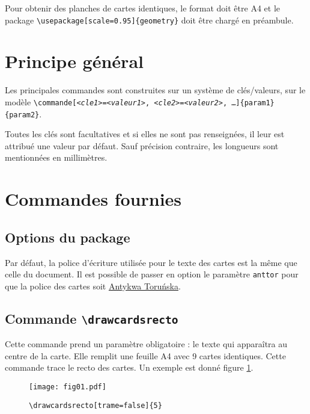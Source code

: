 \documentclass[a4paper, 12pt]{article}
\newcommand{\kv}[2]{\textit{<#1>}\texttt=\textit{<#2>}}
\newcommand{\commande}[1]{\texttt{\textbackslash#1}}
\begin{document}
Pour obtenir des planches de cartes identiques, le format doit être A4 et le package \commande{usepackage[scale=0.95]\{geometry\}} doit être chargé en préambule.

\section{Principe général}
Les principales commandes sont construites sur un système de clés/valeurs, sur le modèle \texttt{\textbackslash commande[\kv{cle1}{valeur1}, \kv{cle2}{valeur2}, …]\{param1\}\{param2\}}.

Toutes les clés sont facultatives et si elles ne sont pas renseignées, il leur est attribué une valeur par défaut. Sauf précision contraire, les longueurs sont mentionnées en millimètres.

\section{Commandes fournies}
	\subsection{Options du package}
Par défaut, la police d'écriture utilisée pour le texte des cartes est la même que celle du document. Il est possible de passer en option le paramètre \texttt{anttor} pour que la police des cartes soit \href{https://tug.org/FontCatalogue/antykwatorunska/}{Antykwa Toruńska}.

	\subsection{Commande \commande{drawcardsrecto}}
Cette commande prend un paramètre obligatoire : le texte qui apparaîtra au centre de la carte. Elle remplit une feuille A4 avec 9 cartes identiques. Cette commande trace le recto des cartes. Un exemple est donné figure \ref{fig:recto}.
\begin{figure}[h]\begin{center}
	\caption{\commande{drawcardsrecto[trame=false]\{5\}}}
	\texttt{[image: fig01.pdf]}\label{fig:recto}
\end{center}\end{figure}
\end{document}
